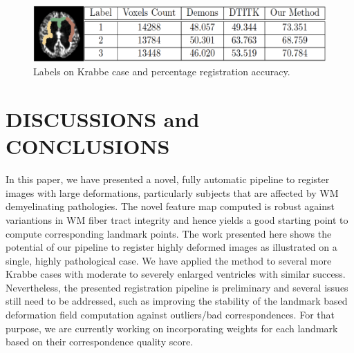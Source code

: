 \documentclass[]{spie}  %
\begin{document}
\begin{figure}[htb]
\label{fig:Label_Table}
\includegraphics[width=1.0\columnwidth]{images/Table_LabelMap.png}
\centering
\caption{Labels on Krabbe case and percentage registration accuracy.}
\end{figure}

\section{DISCUSSIONS and CONCLUSIONS}
In this paper, we have presented a novel, fully automatic pipeline to register images with large deformations, particularly subjects that are affected by WM demyelinating pathologies. The novel feature map computed is robust against variantions in WM fiber tract integrity and hence yields a good starting point to compute corresponding landmark points. The work presented here shows the potential of our pipeline to register highly deformed images as illustrated on a single, highly pathological case. We have applied the method to several more Krabbe cases with moderate to severely enlarged ventricles with similar success. Nevertheless, the presented registration pipeline is preliminary and several issues still need to be addressed, such as improving the stability of the landmark based deformation field computation against outliers/bad correspondences. For that purpose, we are currently working on incorporating weights for each landmark based on their correspondence quality score.



\end{document}
